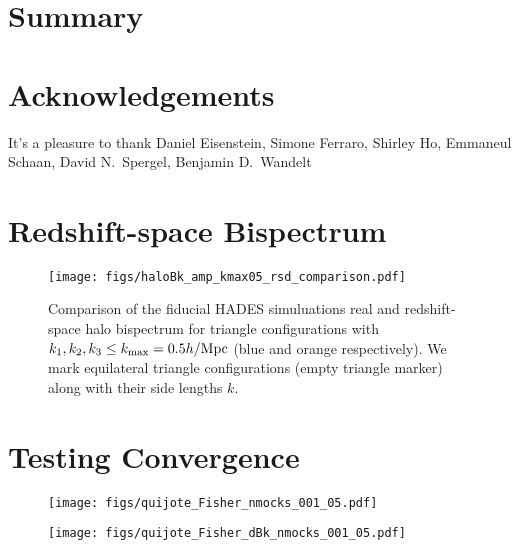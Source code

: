 \documentclass[12pt, letterpaper, preprint]{aastex62}
\begin{document}
\section{Summary} 


\section*{Acknowledgements}
It's a pleasure to thank 
    Daniel Eisenstein, 
    Simone Ferraro, 
    Shirley Ho, 
    Emmaneul Schaan, 
    David N.~Spergel, 
    Benjamin D.~Wandelt


\appendix
\section{Redshift-space Bispectrum} 
\begin{figure}
\begin{center}
    \texttt{[image: figs/haloBk\_amp\_kmax05\_rsd\_comparison.pdf]}
    \caption{Comparison of the fiducial HADES simuluations real and redshift-space halo
    bispectrum for triangle configurations with $k_1, k_2, k_3 \leq k_{\rm max} = 0.5 h/{\rm Mpc}$ 
    (blue and orange respectively). We mark equilateral triangle configurations (empty 
    triangle marker) along with their side lengths $k$.
    }
\label{fig:cov_converge}
\end{center}
\end{figure}

\section{Testing Convergence} 
\begin{figure}
\begin{center}
    \texttt{[image: figs/quijote\_Fisher\_nmocks\_001\_05.pdf]}
    \caption{}
\label{fig:cov_converge}
\end{center}
\end{figure}

\begin{figure}
\begin{center}
    \texttt{[image: figs/quijote\_Fisher\_dBk\_nmocks\_001\_05.pdf]} 
    \caption{}
\label{fig:dbk_converge}
\end{center}
\end{figure}


 
\end{document}
